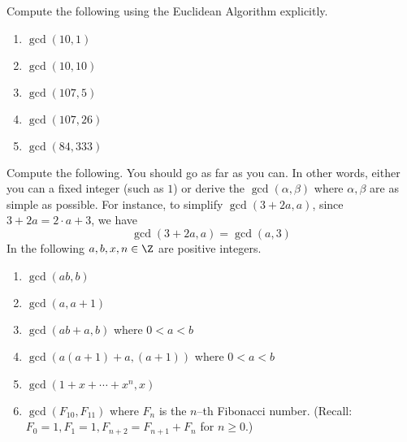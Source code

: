 \begin{ex}
  Compute the following using the Euclidean Algorithm explicitly.
  \begin{enumerate}[nosep,label=\textnormal{(\alph*)}]
  \item $\gcd(10, 1)$
  \item $\gcd(10, 10)$
  \item $\gcd(107, 5)$
  \item $\gcd(107, 26)$
  \item $\gcd(84, 333)$
  \end{enumerate}
\end{ex}

\begin{ex}
  Compute the following.
  You should go as far as you can.
  In other words, either you can a fixed integer (such as $1$) or
  derive the $\gcd(\alpha, \beta)$ where $\alpha, \beta$ are
  as simple as possible.
  For instance, to simplify $\gcd(3 + 2a, a)$, since $3 + 2a = 2 \cdot a + 3$,
  we have
  \[
  \gcd(3 + 2a, a) = \gcd(a, 3)
  \]
  In the following $a, b, x, n \in \Z$ are positive integers.
  \begin{enumerate}[nosep,label=\textnormal{(\alph*)}]
  \item $\gcd(ab, b)$
  \item $\gcd(a, a + 1)$
  \item $\gcd(ab + a, b)$ where $0 < a < b$
  \item $\gcd(a(a+1) + a, (a+1))$ where $0 < a < b$
  \item $\gcd(1 + x + \cdots + x^n, x)$
  \item $\gcd(F_{10}, F_{11})$ where $F_n$ is the $n$--th Fibonacci number.
    (Recall: $F_0 = 1, F_1 = 1, F_{n + 2} = F_{n + 1} + F_n$ for $n \geq 0$.)
  \end{enumerate}
\end{ex}

